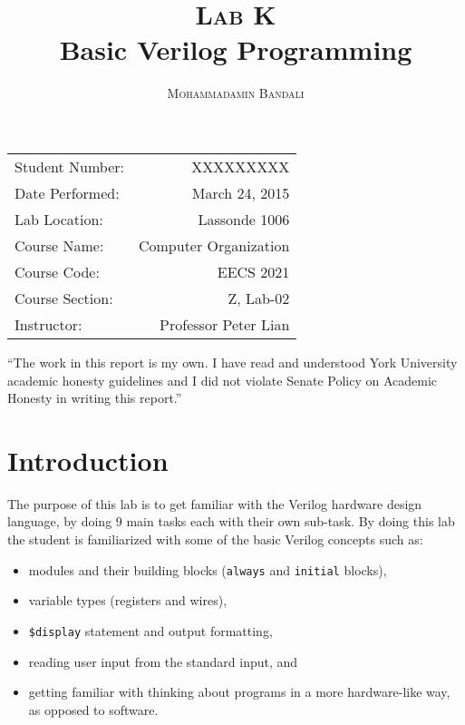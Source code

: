\documentclass{article}
\title{\textsc{Lab K} \\ Basic Verilog Programming } %
\author{\textsc{Mohammadamin Bandali}} %
\date{} %
\newenvironment{statement}{\par\vspace{50ex}}{\clearpage}
\begin{document}
\maketitle %

\begin{center}
\begin{tabular}{l r}
Student Number: & XXXXXXXXX \\ 
Date Performed: & March 24, 2015 \\ %
Lab Location: & Lassonde 1006 \\ 
Course Name: & Computer Organization \\ 
Course Code: & EECS 2021 \\ 
Course Section: & Z, Lab-02\\ 
Instructor: & Professor Peter Lian %
\end{tabular}
\end{center}

\begin{statement}
“The work in this report is my own. I have read and understood York University
academic honesty guidelines and I did not violate Senate Policy on Academic
Honesty in writing this report.”
\end{statement}


\section{Introduction}

The purpose of this lab is to get familiar with the Verilog hardware design language, by doing 9 main tasks each with their own sub-task. By doing this lab the student is familiarized with some of the basic Verilog concepts such as:

\begin{itemize}
\item modules and their building blocks (\verb$always$ and \verb$initial$ blocks),
\item variable types (registers and wires),
\item \verb#$display# statement and output formatting,
\item reading user input from the standard input, and
\item getting familiar with thinking about programs in a more hardware-like way, as opposed to software.
\end{itemize}
\end{document}
